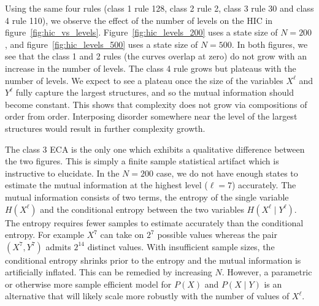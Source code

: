 Using the same four rules (class 1 rule 128, class 2 rule 2, class 3 rule 30
and class 4 rule 110), we observe the effect of the number of levels on the HIC
in figure~\ref{fig:hic_vs_levels}. Figure~\ref{fig:hic_levels_200} uses a state
size of $N\!=\!200$, and figure~\ref{fig:hic_levels_500} uses a state size of
$N\!=\!500$. In both figures, we see that the class 1 and 2 rules (the curves
overlap at zero) do not grow with an increase in the number of levels. The
class 4 rule grows but plateaus with the number of levels. We expect to see a
plateau once the size of the variables $X^\ell$ and $Y^\ell$ fully capture
the largest structures, and so the mutual information should become constant.
This shows that complexity does not grow via compositions of order from order.
Interposing disorder somewhere near the level of the largest structures would
result in further complexity growth.

The class 3 ECA is the only one which exhibits a qualitative difference between
the two figures. This is simply a finite sample statistical artifact which is
instructive to elucidate. In the $N\!=\!200$ case, we do not have enough states to
estimate the mutual information at the highest level ($\ell\!=\!7$) accurately.
The mutual information consists of two terms, the entropy of the single
variable $H(X^\ell)$ and the conditional entropy between the two variables
$H(X^\ell \mid Y^\ell)$. The entropy requires fewer samples to estimate
accurately than the conditional entropy. For example $X^7$ can take on $2^7$
possible values whereas the pair $(X^7, Y^7)$ admits $2^{14}$ distinct values.
With insufficient sample sizes, the conditional entropy shrinks prior to the
entropy and the mutual information is artificially inflated. This can be
remedied by increasing $N$. However, a parametric or otherwise more sample
efficient model for $P(X)$ and $P(X \mid Y)$ is an alternative that will likely
scale more robustly with the number of values of $X^\ell$.
